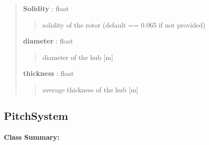 \documentclass[letterpaper,10pt,openany,oneside]{sphinxmanual}
\begin{document}
\begin{fulllineitems}
\begin{quote}
\begin{description}
\textbf{Solidity} : float
\begin{quote}

solidity of the rotor (default == 0.065 if not provided)
\end{quote}

\textbf{diameter} : float
\begin{quote}

diameter of the hub {[}m{]}
\end{quote}

\textbf{thickness} : float
\begin{quote}

average thickness of the hub {[}m{]}
\end{quote}

\end{description}\end{quote}

\end{fulllineitems}



\subsection{PitchSystem}
\label{documentation:pitchsystem-class-label}\label{documentation:pitchsystem}\paragraph{Class Summary:}
\end{document}
